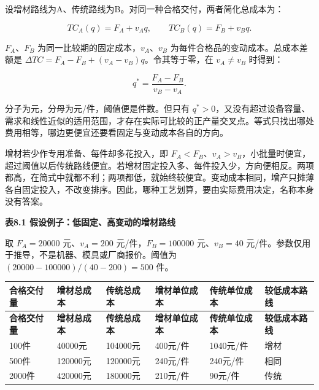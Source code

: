 \documentclass[UTF8,fontset=windows,12pt,a4paper,oneside,openany]{ctexbook}
\begin{document}
设增材路线为A、传统路线为B。对同一种合格交付，两者简化总成本为：

\[
TC_A(q)=F_A+v_Aq,\qquad TC_B(q)=F_B+v_Bq.
\]

$F_A$、$F_B$ 为同一比较期的固定成本，$v_A$、$v_B$ 为每件合格品的变动成本。总成本差额是 $\Delta TC=F_A-F_B+(v_A-v_B)q$。令其等于零，在 $v_A\ne v_B$ 时得到：

\[
q^*=\frac{F_A-F_B}{v_B-v_A}.
\]

分子为元，分母为元/件，阈值便是件数。但只有 $q^*>0$，又没有超过设备容量、需求和线性近似的适用范围，才存在实际可比较的正产量交叉点。等式只找出哪处费用相等，哪边更便宜还要看固定与变动成本各自的方向。

增材若少作专用准备、每件却多花投入，即 $F_A<F_B$、$v_A>v_B$，小批量时便宜，超过阈值以后传统路线便宜。若增材固定投入多、每件投入少，方向便相反。两项都高，在简式中就都不利；两项都低，就始终较便宜。变动成本相同，增产只摊薄各自固定投入，不改变排序。因此，哪种工艺划算，要由实际费用决定，名称本身没有答案。

\textbf{表8.1 假设例子：低固定、高变动的增材路线}

取 $F_A=20000$ 元、$v_A=200$ 元/件，$F_B=100000$ 元、$v_B=40$ 元/件。参数仅用于推导，不是机器、模具或厂商报价。阈值为 $(20000-100000)/(40-200)=500$ 件。

\begingroup\footnotesize\setlength{\tabcolsep}{4pt}\renewcommand{\arraystretch}{1.25}
\begin{longtable}{>{\raggedright\arraybackslash}p{}>{\raggedright\arraybackslash}p{}>{\raggedright\arraybackslash}p{}>{\raggedright\arraybackslash}p{}>{\raggedright\arraybackslash}p{}>{\raggedright\arraybackslash}p{}}
\toprule
\textbf{合格交付量} & \textbf{增材总成本} & \textbf{传统总成本} & \textbf{增材单位成本} & \textbf{传统单位成本} & \textbf{较低成本路线} \\
\midrule\endfirsthead
\toprule
\textbf{合格交付量} & \textbf{增材总成本} & \textbf{传统总成本} & \textbf{增材单位成本} & \textbf{传统单位成本} & \textbf{较低成本路线} \\
\midrule\endhead
\bottomrule\endfoot
100件 & 40000元 & 104000元 & 400元/件 & 1040元/件 & 增材 \\
500件 & 120000元 & 120000元 & 240元/件 & 240元/件 & 相同 \\
2000件 & 420000元 & 180000元 & 210元/件 & 90元/件 & 传统 \\
\end{longtable}\endgroup
\end{document}
